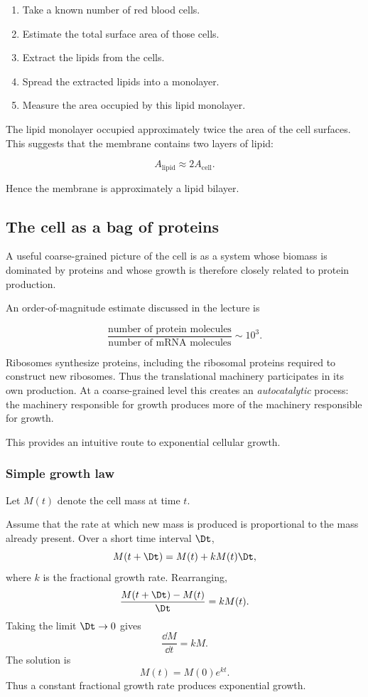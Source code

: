\begin{enumerate}
    \item Take a known number of red blood cells.
    \item Estimate the total surface area of those cells.
    \item Extract the lipids from the cells.
    \item Spread the extracted lipids into a monolayer.
    \item Measure the area occupied by this lipid monolayer.
\end{enumerate}

The lipid monolayer occupied approximately twice the area of the cell
surfaces. This suggests that the membrane contains two layers of lipid:

\[
    A_{\mathrm{lipid}} \approx 2 A_{\mathrm{cell}}.
\]

Hence the membrane is approximately a lipid bilayer.


\subsection{The cell as a bag of proteins}

A useful coarse-grained picture of the cell is as a system whose biomass
is dominated by proteins and whose growth is therefore closely related
to protein production.

An order-of-magnitude estimate discussed in the lecture is

\[
    \frac{\text{number of protein molecules}}{\text{number of mRNA molecules}} \sim 10^3.
\]

Ribosomes synthesize proteins, including the ribosomal proteins required to construct new ribosomes. 
Thus the translational machinery participates in its own production. 
At a coarse-grained level this creates an \emph{autocatalytic} process: the machinery responsible for growth produces more of the machinery responsible for growth.

This provides an intuitive route to exponential cellular growth.

\subsubsection*{Simple growth law}

Let $M(t)$ denote the cell mass at time $t$.

Assume that the rate at which new mass is produced is proportional to the mass already present. 
Over a short time interval $\Dt$, 
\[
    M(t+\Dt) = M(t) + kM(t)\Dt,
\] 
where $k$ is the fractional growth rate. 
Rearranging, 
\[
    \frac{M(t+\Dt)-M(t)}{\Dt} = kM(t).
\] 
Taking the limit $\Dt\rightarrow 0$ gives 
\[
    \frac{\dd M}{\dd t} = kM.
\] 
The solution is 
\[ 
    M(t) = M(0)e^{kt}.
\] 
Thus a constant fractional growth rate produces exponential growth.



